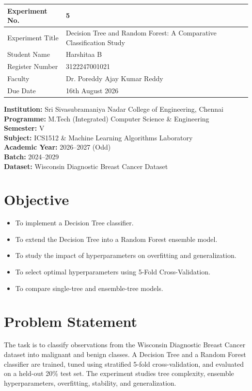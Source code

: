 \documentclass[12pt,a4paper]{article}
\begin{document}
\begin{tabular}{|p{4cm}|p{11cm}|}
\hline
Experiment No. & 5 \\ \hline
Experiment Title & Decision Tree and Random Forest: A Comparative Classification Study \\ \hline
Student Name & Harshitaa B \\ \hline
Register Number & 3122247001021\\ \hline
Faculty & Dr. Poreddy Ajay Kumar Reddy \\ \hline
Due Date & 16th August 2026\\ \hline
\end{tabular}

\vspace{0.4cm}
\noindent\textbf{Institution:} Sri Sivasubramaniya Nadar College of Engineering, Chennai\\
\textbf{Programme:} M.Tech (Integrated) Computer Science \& Engineering\\
\textbf{Semester:} V\\
\textbf{Subject:} ICS1512 \& Machine Learning Algorithms Laboratory\\
\textbf{Academic Year:} 2026--2027 (Odd)\\
\textbf{Batch:} 2024--2029\\
\textbf{Dataset:} Wisconsin Diagnostic Breast Cancer Dataset

\section{Objective}
\begin{itemize}
\item To implement a Decision Tree classifier.
\item To extend the Decision Tree into a Random Forest ensemble model.
\item To study the impact of hyperparameters on overfitting and generalization.
\item To select optimal hyperparameters using 5-Fold Cross-Validation.
\item To compare single-tree and ensemble-tree models.
\end{itemize}

\section{Problem Statement}
The task is to classify observations from the Wisconsin Diagnostic Breast Cancer dataset into malignant and benign classes. A Decision Tree and a Random Forest classifier are trained, tuned using stratified 5-fold cross-validation, and evaluated on a held-out 20\% test set. The experiment studies tree complexity, ensemble hyperparameters, overfitting, stability, and generalization.
\end{document}
